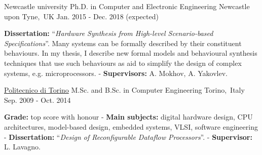 
\begin{cventries}


\cventry
{Newcastle university} %
{Ph.D. in Computer and Electronic Engineering} %
{Newcastle upon Tyne,~UK} %
{Jan. 2015 - Dec. 2018 (expected)} %
{ %
\begin{cvitems}
\textbf{Dissertation:} ``\textit{Hardware Synthesis from High-level 
Scenario-based Specifications}''. Many systems can be formally described 
by their constituent behaviours. In my thesis, I describe new formal models and 
behavioural synthesis techniques that use such behaviours as aid to 
simplify the design of complex systems, e.g. microprocessors. - 
\textbf{Supervisors:} A. Mokhov, A. Yakovlev.
\end{cvitems}
}


\cventry
{\href{https://www.polito.it/?lang=en}{\color{myblue}Politecnico di Torino}}
{M.Sc. and B.Sc. in Computer Engineering}
{Torino,~Italy}
{Sep. 2009 - Oct. 2014}
{
\begin{cvitems}
\textbf{Grade:} top score with honour - \textbf{Main subjects:} 
digital hardware design, CPU architectures, model-based design, embedded 
systems, VLSI, software engineering - \textbf{Dissertation:} ``\emph{Design 
of Reconfigurable Dataflow Processors}''. - \textbf{Supervisor:} L. Lavagno.
\end{cvitems}
}


\end{cventries}
\vspace{-1mm}